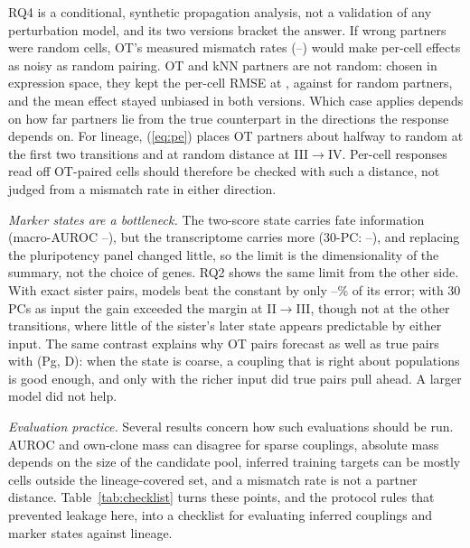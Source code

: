 \documentclass[10pt,journal,compsoc]{IEEEtran}
\begin{document}
RQ4 is a conditional, synthetic propagation analysis, not a validation of any perturbation
model, and its two versions bracket the answer. If wrong partners were random cells, OT's
measured mismatch rates (\rqFourMeasMin--\rqFourMeasMax) would make per-cell effects as
noisy as random pairing. OT and kNN partners are not random: chosen in expression space,
they kept the per-cell RMSE at \strOTSampRMSE, against \strRandRMSE{} for random partners,
and the mean effect stayed unbiased in both versions. Which case applies depends on how far
partners lie from the true counterpart in the directions the response depends on. For
lineage, (\ref{eq:pe}) places OT partners about halfway to random at the first two
transitions and at random distance at III$\to$IV. Per-cell responses read off OT-paired
cells should therefore be checked with such a distance, not judged from a mismatch rate in
either direction.

\emph{Marker states are a bottleneck.} The two-score state carries fate information
(macro-AUROC \rqThreeAUCPgDMinT--\rqThreeAUCPgDMaxT), but the transcriptome carries more
(30-PC: \rqThreeAUCPCMinT--\rqThreeAUCPCMaxT), and replacing the pluripotency panel changed
little, so the limit is the dimensionality of the summary, not the choice of genes. RQ2
shows the same limit from the other side. With exact sister pairs, models beat the
constant by only \rqTwoTrueGainMinPct--\rqTwoTrueGainMaxPct\% of its error; with 30 PCs as
input the gain exceeded the margin at II$\to$III, though not at the other transitions, where
little of the sister's later state appears predictable by either input. The same contrast
explains why OT pairs forecast as well as true pairs with (Pg, D): when the state is coarse,
a coupling that is right about populations is good enough, and only with the richer input
did true pairs pull ahead. A larger model did not help.

\emph{Evaluation practice.} Several results concern how such evaluations should be run.
AUROC and own-clone mass can disagree for sparse couplings, absolute mass depends on the
size of the candidate pool, inferred training targets can be mostly cells outside the
lineage-covered set, and a mismatch rate is not a partner distance.
Table~\ref{tab:checklist} turns these points, and the protocol rules that prevented leakage
here, into a checklist for evaluating inferred couplings and marker states against lineage.
\end{document}
